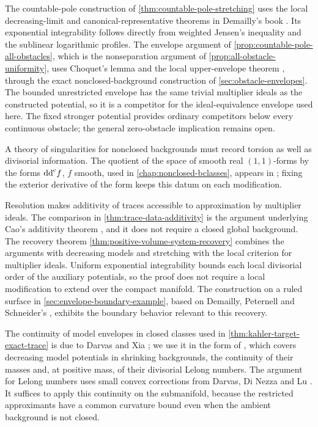 The countable-pole construction of \cref{thm:countable-pole-stretching} uses the local decreasing-limit and canonical-representative theorems in Demailly's book \cite[Chapter~I, Theorems~5.4 and~5.8, pp.~39--40]{DemCADG}. Its exponential integrability follows directly from weighted Jensen's inequality and the sublinear logarithmic profiles. The envelope argument of \cref{prop:countable-pole-all-obstacles}, which is the nonseparation argument of \cref{prop:all-obstacle-uniformity}, uses Choquet's lemma and the local upper-envelope theorem \cite[Chapter~I, Lemma~4.23 and Theorem~5.7, pp.~38--40]{DemCADG}, through the exact nonclosed-background construction of \cref{sec:obstacle-envelopes}. The bounded unrestricted envelope has the same trivial multiplier ideals as the constructed potential, so it is a competitor for the ideal-equivalence envelope used here. The fixed stronger potential provides ordinary competitors below every continuous obstacle; the general zero-obstacle implication remains open.

A theory of singularities for nonclosed backgrounds must record torsion as well as divisorial information. The quotient of the space of smooth real $(1,1)$-forms by the forms $\mathrm{dd}^{\mathrm{c}} f$, $f$ smooth, used in \cref{chap:nonclosed-bclasses}, appears in \cite[Section 1]{BGL25}; fixing the exterior derivative of the form keeps this datum on each modification.

Resolution makes additivity of traces accessible to approximation by multiplier ideals. The comparison in \cref{thm:trace-data-additivity} is the argument underlying Cao's additivity theorem \cite[proof of Theorem~1.4, pp.~118--119]{Cao15}, and it does not require a closed global background. The recovery theorem \cref{thm:positive-volume-system-recovery} combines the arguments with decreasing models and stretching with the local criterion for multiplier ideals. Uniform exponential integrability bounds each local divisorial order of the auxiliary potentials, so the proof does not require a local modification to extend over the compact manifold. The construction on a ruled surface in \cref{sec:envelope-boundary-example}, based on Demailly, Peternell and Schneider's \cite[Example 1.7]{DPS94}, exhibits the boundary behavior relevant to this recovery.

The continuity of model envelopes in closed classes used in \cref{thm:kahler-target-exact-trace} is due to Darvas and Xia \cite{DX24}; we use it in the form of \cite[Proposition~3.1.12, (3.23)--(3.24)]{SGPT}, which covers decreasing model potentials in shrinking backgrounds, the continuity of their masses and, at positive mass, of their divisorial Lelong numbers. The argument for Lelong numbers uses small convex corrections from Darvas, Di Nezza and Lu \cite[Lemma~4.3, p.~154]{DDNL21}. It suffices to apply this continuity on the submanifold, because the restricted approximants have a common curvature bound even when the ambient background is not closed.

